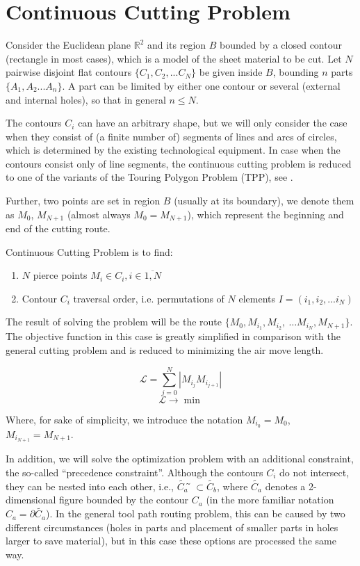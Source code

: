 \documentclass[]{llncs}
\begin{document}
\section{Continuous Cutting Problem}

Consider the Euclidean plane
$\mathbb R ^ 2$
and its region $B$ bounded by a closed contour
(rectangle in most cases),
which is a model of the sheet material to be cut.
Let $N$ pairwise disjoint flat contours
$\{C_1, C_2, ... C_N\}$
be given inside $B$, bounding $n$ parts
$\{A_1, A_2 ... A_n\}$.
A part can be limited by either one contour or several
(external and internal holes),
so that in general
$n \le N$.

The contours
$C_i$
can have an arbitrary shape,
but we will only consider the case
when they consist of (a finite number of)
segments of lines and arcs of circles,
which is determined by the existing technological equipment.
In case when the contours consist only of line segments,
the continuous cutting problem
is reduced to one of the variants of the
Touring Polygon Problem (TPP),
see \cite{bi13}.

Further, two points are set in region $B$ (usually at its boundary),
we denote them as
$M_0$, $M_{N + 1}$
(almost always $M_0 = M_{N + 1}$),
which represent the beginning and end of the cutting route.

Continuous Cutting Problem is to find:
\begin{enumerate}
\item $N$ pierce points $M_i \in C_i, i \in \overline{1, N}$
\item Contour $C_i$ traversal order, i.e. permutations of $N$ elements $I = (i_1, i_2, ... i_N)$
\end{enumerate}

The result of solving the problem will be the route
$\{M_0, M_{i_1}, M_{i_2}, \ \dots M_{i_N}, \allowbreak M_{N + 1}\}$.
The objective function in this case is greatly simplified
in comparison with the general cutting problem
and is reduced to minimizing the air move length.

\begin{equation}
  \mathcal{L} = \sum_{j=0}^N|M_{i_j}M_{i_{j+1}}|
  \label{air-move-length}
\end{equation}
$$
\mathcal{L} \to \min
$$

Where, for sake of simplicity, we introduce the notation
$M_{i_0} = M_0$,
$M_{i_{N + 1}} = M_{N + 1}$.

In addition,
we will solve the optimization problem
with an additional constraint,
the so-called ``precedence constraint''.
Although the contours $C_i$
do not intersect,
they can be nested into each other, i.e.,
$\tilde{C_a} ̃\subset \tilde{C_b}$,
where
$\tilde{C_a}$
denotes a 2-dimensional figure bounded by the contour
$C_a$
(in the more familiar notation
$C_a = \partial \tilde{C_a}$).
In the general tool path routing problem,
this can be caused by two different circumstances
(holes in parts and
placement of smaller parts
in holes larger to save material),
but in this case
these options are processed the same way.
\end{document}
